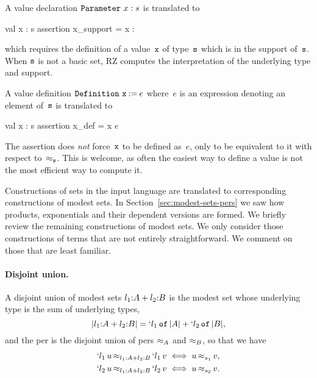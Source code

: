A value declaration $\iParameter{x}{s}$ is translated to
%
\begin{source}
val x : s
assertion x_support = x : 
\end{source}
%
which requires the definition of a value~$\f{x}$ of type~$\f{s}$ which is in
the support of~$\f{s}$.
\iflong
When $\f{s}$ is not a basic set, RZ computes the
interpretation of the underlying type and support.
\fi

A value definition $\iDefinition{\f{x}}{e}$ where~$e$ is an expression
denoting an element of~$\f{s}$ is translated to
%
\newcommand{\iE}{$e$}
\begin{source}
val x : s
assertion x_def =  x  \iE
\end{source}
%
The assertion does \emph{not} force~$\f{x}$ to be defined as~$e$, only
to be equivalent to it with respect to~$\per_{\f{s}}$. This is
welcome, as often the easiest way to define a value is not the most
efficient way to compute it.

Constructions of sets in the input language are translated to
corresponding constructions of modest sets.
%
\iflong
In Section~\ref{sec:modest-sets-pers} we saw how products,
exponentials and their dependent versions are formed. We briefly
review the remaining constructions of modest sets. We only consider
those constructions of terms that are not entirely straightforward.
%
\else
%
We comment on those that are least familiar.
%
\fi

\iflong
\paragraph{Disjoint union.}
%
A disjoint union of modest sets $\isum{\il_1}{A}{\il_2}{B}$ is the
modest set whose underlying type is the sum of underlying types,
%
\begin{equation*}
  \typeOf{\isum{\il_1}{A}{\il_2}{B}} =
  \osumtyx{\il_1}{\typeOf{A}}{\il_2}{\typeOf{B}},
\end{equation*}
%
and the per is the disjoint union of pers $\per_{A}$ and $\per_{B}$, so
that we have
%
\begin{align*}
  \oper{\isum{\il_1}{A}{\il_2}{B}}{\oinj{\il_1}{u}}{\oinj{\il_1}{v}}
  &\iff \oper{s_1}{u}{v},
  \\
  \oper{\isum{\il_1}{A}{\il_2}{B}}{\oinj{\il_2}{u}}{\oinj{\il_2}{v}}
  &\iff \oper{s_2}{u}{v}.
\end{align*}
\fi %


